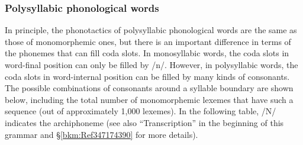 \subsubsection{Polysyllabic phonological words}
\label{bkm:Ref347179283}\hypertarget{RefHeadingToc395696973}{}\label{bkm:Ref347178311}
In principle, the phonotactics of polysyllabic phonological words are the same as those of monomorphemic ones, but there is an important difference in terms of the phonemes that can fill coda slots. In monosyllabic words, the coda slots in word-final position can only be filled by /n/. However, in polysyllabic words, the coda slots in word-internal position can be filled by many kinds of consonants. The possible combinations of consonants around a syllable boundary are shown below, including the total number of monomorphemic lexemes that have such a sequence (out of approximately 1,000 lexemes). In the following table, /N/ indicates the archiphoneme (see also “Transcription” in the beginning of this grammar and §\ref{bkm:Ref347174390} for more details).

